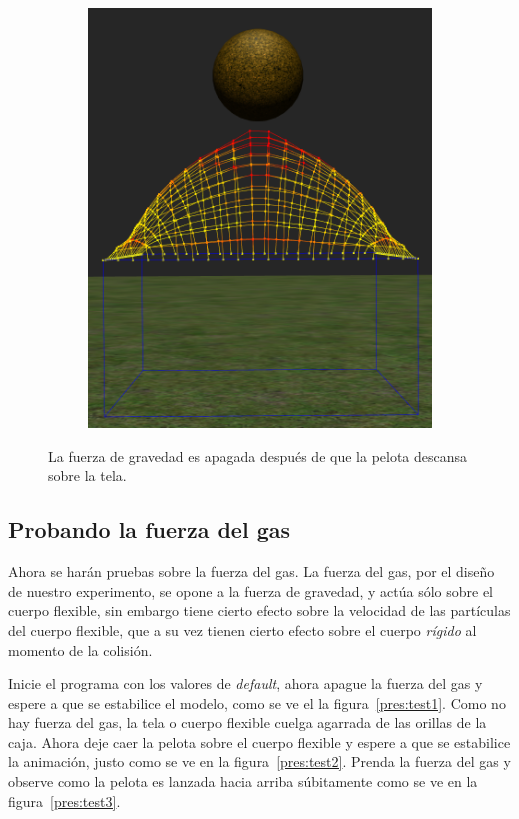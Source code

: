 \begin{figure}
\begin{subfigure}[b]{0.3\textwidth}
  \end{subfigure}
~
  \begin{subfigure}[b]{0.3\textwidth}
    \includegraphics[width=\textwidth]{Img/04/gravityOff3}
  \end{subfigure}
 \caption[Experimento: Apagar la fuerza de gravedad]{La fuerza de gravedad es apagada después de que la pelota descansa sobre la tela.} 
 \label{fig:noGravity}
\end{figure}

\subsection{Probando la fuerza del gas}
Ahora se harán pruebas sobre la fuerza del gas. La fuerza del gas, por el diseño de nuestro experimento, se opone a la fuerza de gravedad, y actúa sólo sobre el cuerpo flexible, sin embargo tiene cierto efecto sobre la velocidad de las partículas del cuerpo flexible, que a su vez tienen cierto efecto sobre el cuerpo \emph{rígido} al momento de la colisión.

Inicie el programa con los valores de \emph{\foreignlanguage{english}{default}}, ahora apague la fuerza del gas y espere a que se estabilice el modelo, como se ve el la figura~\ref{pres:test1}.
Como no hay fuerza del gas, la tela o cuerpo flexible cuelga agarrada de las orillas de la caja.
Ahora deje caer la pelota sobre el cuerpo flexible y espere a que se estabilice la animación, justo como se ve en la figura~\ref{pres:test2}. 
Prenda la fuerza del gas y observe como la pelota es lanzada hacia arriba súbitamente como se ve en la figura~\ref{pres:test3}.

